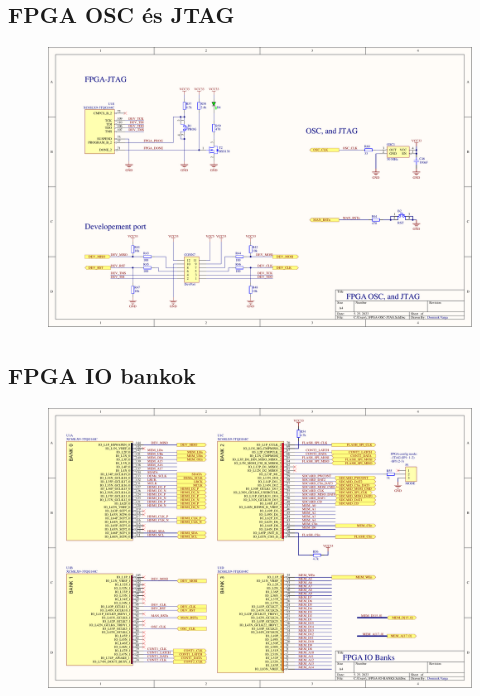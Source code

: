 \subsection{FPGA OSC és JTAG}
\label{sec:OSC-JTAG}
\begin{figure}[H]
	\centering
	\includegraphics[width=220mm, keepaspectratio, angle=90]{figures/JTAG-OSC}
\end{figure}
\subsection{FPGA IO bankok}
\label{sec:FPGA-BANKS}
\begin{figure}[H]
	\centering
	\includegraphics[width=220mm, keepaspectratio, angle=90]{figures/FPGA-BANKS}
\end{figure}
